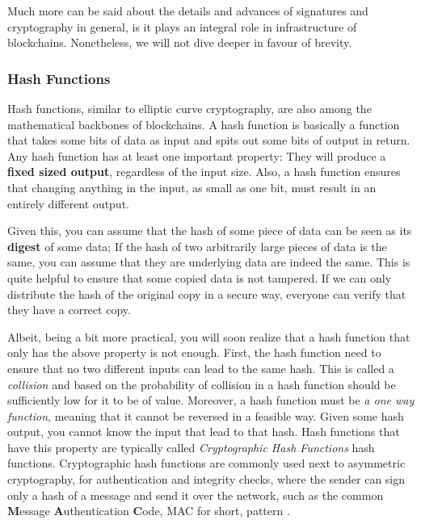 Much more can be said about the details and advances of signatures and cryptography in general, is
it plays an integral role in infrastructure of blockchains. Nonetheless, we will not dive deeper in
favour of brevity.

\subsubsection{Hash Functions} \label{chap_bg:subsec:hash}

Hash functions, similar to elliptic curve cryptography, are also among the mathematical backbones of
blockchains. A hash function is basically a function that takes some bits of data as input and spits
out some bits of output in return. Any hash function has at least one important property: They will
produce a \textbf{fixed sized output}, regardless of the input size. Also, a hash function ensures
that changing anything in the input, as small as one bit, must result in an entirely different
output.

Given this, you can assume that the hash of some piece of data can be seen as its \textbf{digest} of
some data; If the hash of two arbitrarily large pieces of data is the same, you can assume that they
are underlying data are indeed the same. This is quite helpful to ensure that some copied data is
not tampered. If we can only distribute the hash of the original copy in a secure way, everyone can
verify that they have a correct copy.

Albeit, being a bit more practical, you will soon realize that a hash function that only has the
above property is not enough. First, the hash function need to ensure that no two different inputs
can lead to the same hash. This is called a \textit{collision} and based on the probability of
collision in a hash function should be sufficiently low for it to be of value. Moreover, a hash
function must be \textit{a one way function}, meaning that it cannot be reversed in a feasible way.
Given some hash output, you cannot know the input that lead to that hash. Hash functions that have
this property are typically called \textit{Cryptographic Hash Functions} hash functions.
Cryptographic hash functions are commonly used next to asymmetric cryptography, for authentication
and integrity checks, where the sender can sign only a hash of a message and send it over the
network, such as the common \textbf{M}essage \textbf{A}uthentication \textbf{C}ode, MAC for short,
pattern \cite{HMAC_Bellare_Canetti_Krawczyk_1996}.


